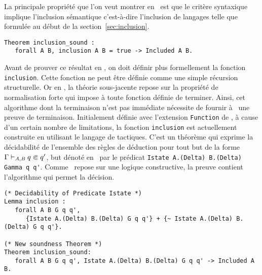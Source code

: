 
La principale propriété que l'on veut montrer en \coq\ est que le critère syntaxique
implique l'inclusion sémantique c'est-à-dire l'inclusion de langages telle que formulée
au début de la section~\ref{sec:inclusion}.

\begin{lstlisting}
Theorem inclusion_sound :
   forall A B, inclusion A B = true -> Included A B.
\end{lstlisting}

Avant de prouver ce résultat en \coq, on doit définir plus formellement la fonction
\lstinline!inclusion!. Cette fonction ne peut être définie comme une simple récursion structurelle.
Or en \coq, la théorie sous-jacente repose sur la propriété de normalisation forte qui impose à toute
fonction définie de terminer. Ainsi, cet algorithme dont la terminaison n'est pas immédiate
nécessite de fournir à \coq\ une preuve de terminaison.
Initialement définie avec l'extension \lstinline!Function! de \coq, à cause d'un certain nombre de limitations,
la fonction \lstinline!inclusion! est actuellement construite en utilisant le langage de tactiques. C'est un théorème
qui exprime la décidabilité de l'ensemble des règles de déduction pour tout but de la forme $\Gamma \vdash_{\mathit A, \mathit B} q \Subset q'$,
but dénoté en \coq\ par le prédicat \lstinline!Istate A.(Delta) B.(Delta) Gamma q q'!. Comme \coq\ repose sur une logique constructive,
la preuve contient l'algorithme qui permet la décision.

\begin{lstlisting}
(* Decidability of Predicate Istate *)
Lemma inclusion :
   forall A B G q q',
      {Istate A.(Delta) B.(Delta) G q q'} + {~ Istate A.(Delta) B.(Delta) G q q'}.

(* New soundness Theorem *)
Theorem inclusion_sound:
   forall A B G q q', Istate A.(Delta) B.(Delta) G q q' -> Included A B.
\end{lstlisting}

